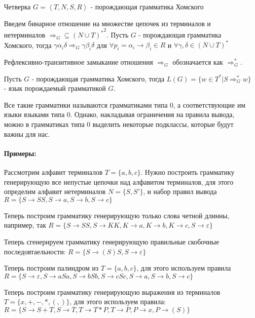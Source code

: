 \begin{Def}
Четверка $G = \left<T,N,S,R\right>$ - порождающая грамматика Хомского
\end{Def}

Введем бинарное отношение на множестве цепочек из терминалов и нетерминалов $\Rightarrow_G \subseteq {\left(N \cup T\right)^{*}}^2$. Пусть $G$ - порождающая
грамматика Хомского, тогда $\gamma \alpha_i \delta \Rightarrow_G \gamma \beta_i \delta$ для $\forall p_i = \alpha_i \rightarrow \beta_i \in R$ и
$\forall \gamma,\delta \in \left(N\cup T\right)^{*}$

Рефлексивно-транзитивное замыкание отношения $\Rightarrow_G$ обозначается как $\Rightarrow_G^{*}$.

\begin{Def}
Пусть $G$ - порождающая грамматика Хомского, тогда $L\left(G\right) = \{w \in T^{*} | S \Rightarrow_G^{*} w\}$ - язык порождаемый грамматикой $G$.
\end{Def}

Все такие грамматики называются грамматиками типа 0, а соответствующие им языки языками типа 0. Однако, накладывая ограничения на правила вывода, можно в грамматиках
типа 0 выделить некоторые подклассы, которые будут важны для нас.

\paragraph{Примеры:}

Рассмотрим алфавит терминалов $T = \{a,b,c\}$. Нужно построить грамматику генерирующую все непустые цепочки над алфавитом терминалов, для этого определим алфавит
нетерминалов $N = \{S, S'\}$, и набор правил вывода $R = \{S \rightarrow SS, S \rightarrow a, S \rightarrow b, S \rightarrow c\}$

Теперь построим грамматику генерирующую только слова четной длинны, например, так
$R = \{S \rightarrow SS, S \rightarrow KK, K \rightarrow a, K\rightarrow b, K\rightarrow c, S \rightarrow \varepsilon\}$

Теперь сгенерируем грамматику генерирующую правильные скобочные последовтаельности: $R = \{S \rightarrow (S)S, S \rightarrow \varepsilon\}$

Теперь построим палиндром из $T = \{a,b,c\}$, для этого используем правила $R = \{S \rightarrow \varepsilon, S \rightarrow aSa, S\rightarrow bSb, S\rightarrow cSc, S \rightarrow a, S\rightarrow b, S\rightarrow c\}$

Теперь построим грамматику генерирующую выражения из терминалов $T = \{x,+,-,*,(,)\}$, для этого используем правила:
$R = \{S \rightarrow S + T, S \rightarrow T, T \rightarrow T * P, T \rightarrow P, P \rightarrow x, P \rightarrow (S)\}$

